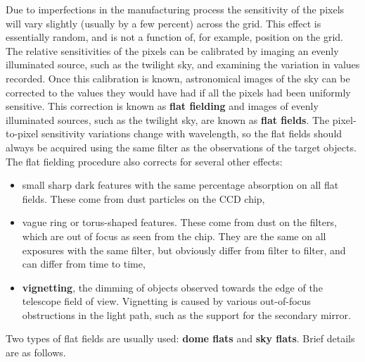 \documentclass[twoside,11pt]{starlink}
\begin{document}
Due to imperfections in the manufacturing process the sensitivity of
the pixels will vary slightly (usually by a few percent) across the
grid.  This effect is essentially random, and is not a function of,
for example, position on the grid.  The relative sensitivities of the
pixels can be calibrated by imaging an evenly illuminated source, such as
the twilight sky, and examining the variation in values recorded.  Once this
calibration is known, astronomical images of the sky can be corrected to
the values they would have had if all the pixels had been uniformly
sensitive.  This correction is known as \textbf{flat fielding}
and images of evenly illuminated sources, such as the twilight sky, are
known as \textbf{flat fields}.  The pixel-to-pixel sensitivity variations
change with wavelength, so the flat fields should always be acquired
using the same filter as the observations of the target objects.
The flat fielding procedure also corrects for several other effects:

\begin{itemize}

  \item small sharp dark features with the same percentage absorption on
   all flat fields. These come from dust particles on the CCD chip,

  \item vague ring or torus-shaped features.  These come from dust on the
    filters, which are out of focus as seen from the chip.  They are
    the same on all exposures with the same filter, but obviously
    differ from filter to filter, and can differ from time to time,

  \item \textbf{vignetting}, the dimming of objects observed towards the edge
   of the telescope field of view.  Vignetting is caused by various
   out-of-focus obstructions in the light path, such as the support for the
   secondary mirror.

\end{itemize}

Two types of flat fields are usually used: \textbf{dome flats} and \textbf{sky flats}.  Brief details are as follows.
\end{document}
